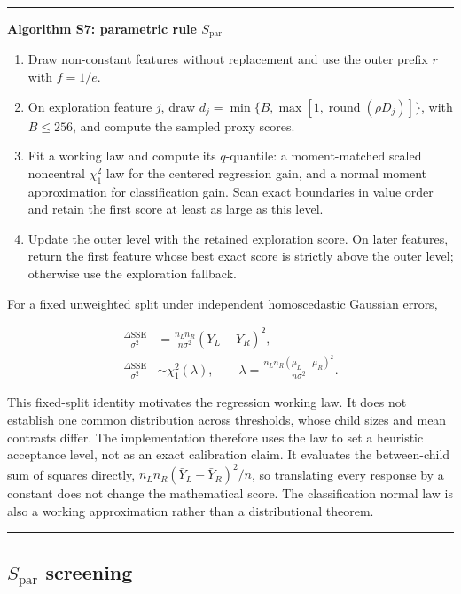 \documentclass[final,5p,times,twocolumn]{elsarticle}
\newenvironment{suppalgorithm}[1]{%
  \par\medskip\noindent\begin{minipage}{\columnwidth}\small
  \hrule\smallskip\textbf{#1}\par\smallskip
}{%
  \smallskip\hrule\end{minipage}\par\medskip
}
\begin{document}
\begin{suppalgorithm}{Algorithm S7: parametric rule \(S_{\mathrm{par}}\)}
\begin{enumerate}
\setlength{\itemsep}{0pt}
\item Draw non-constant features without replacement and use the outer prefix
      \(r\) with \(f=1/e\).
\item On exploration feature \(j\), draw
      \(d_j=\min\{B,\max[1,\operatorname{round}(\rho D_j)]\}\), with
      \(B\leq256\), and compute the sampled proxy scores.
\item Fit a working law and compute its \(q\)-quantile: a moment-matched scaled
      noncentral \(\chi^2_1\) law for the centered regression gain, and a normal
      moment approximation for classification gain.  Scan exact boundaries in
      value order and retain the first score at least as large as this level.
\item Update the outer level with the retained exploration score.  On later
      features, return the first feature whose best exact score is strictly
      above the outer level; otherwise use the exploration fallback.
\end{enumerate}
For a fixed unweighted split under independent homoscedastic Gaussian errors,

\begin{align*}
 \frac{\Delta\mathrm{SSE}}{\sigma^2}
 &=\frac{n_Ln_R}{n\sigma^2}(\bar Y_L-\bar Y_R)^2,\\
 \frac{\Delta\mathrm{SSE}}{\sigma^2}
 &\sim\chi^2_1(\lambda),\qquad
 \lambda=\frac{n_Ln_R(\mu_L-\mu_R)^2}{n\sigma^2}.
\end{align*}

This fixed-split identity \cite{cochran1934quadratic} motivates the regression
working law.  It does not establish one common distribution across thresholds,
whose child sizes and mean contrasts differ.  The implementation therefore
uses the law to set a heuristic acceptance level, not as an exact calibration
claim.  It evaluates the between-child sum of squares directly,
\(n_Ln_R(\bar Y_L-\bar Y_R)^2/n\), so translating every response by a constant
does not change the mathematical score.  The classification normal law is also
a working approximation rather than a distributional theorem.
\end{suppalgorithm}

\subsection{\(S_{\mathrm{par}}\) screening}
\label{sec:supp_spar_results}
\end{document}
